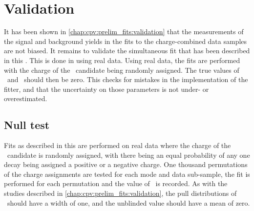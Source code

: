 \begin{table}
  \centering
  \caption{%
    Model parameters as determined in the preliminary fit to the 2012 magnet
    down subset of the \pKK\ data.
  }
  \label{tab:cpv:araw:params:pKK}
  
\end{table}

\begin{table}
  \centering
  \caption{%
    Model parameters as determined in the preliminary fit to the 2012 magnet
    down subset of the \ppipi\ data.
  }
  \label{tab:cpv:araw:params:ppipi}
  
\end{table}

\section{Validation}
\label{chap:cpv:araw:validation}

It has been shown in \cref{chap:cpv:prelim_fits:validation} that the
measurements of the signal and background yields in the fits to the
charge-combined data samples are not biased.
It remains to validate the simultaneous fit that has been described in this
.
This is done in using real data.
Using real data, the fits are performed with the charge of the \PLambdac\
candidate being randomly assigned.
The true values of \ARaw\ and \ARawBg\ should then be zero.
This checks for mistakes in the implementation of the fitter, and that the
uncertainty on those parameters is not under- or overestimated.

\subsection{Null test}
\label{chap:cpv:araw:validation:null}

Fits as described in this  are performed on real data
where the charge of the \PLambdac\ candidate is randomly assigned, with there
being an equal probability of any one decay being assigned a positive or a
negative charge.
One thousand permutations of the charge assignments are tested for each mode
and data sub-sample, the fit is performed for each permutation and the value of
\ARaw\ is recorded.
As with the studies described in \cref{chap:cpv:prelim_fits:validation}, the
pull distributions of \ARaw\ should have a width of one, and the unblinded
value should have a mean of zero.

